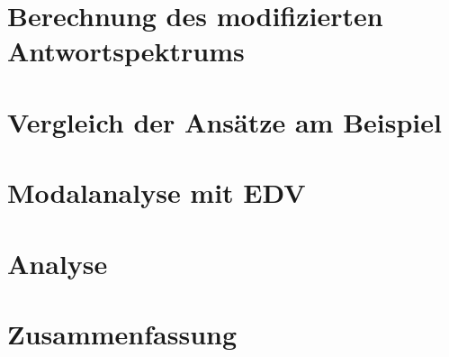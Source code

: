 \documentclass[12pt, oneside]{report}
\begin{document}
\chapter{Berechnung des modifizierten Antwortspektrums}


\chapter{Vergleich der Ansätze am Beispiel}


\chapter{Modalanalyse mit EDV}


\chapter{Analyse}


\chapter{Zusammenfassung}


\appendix

\end{document}

